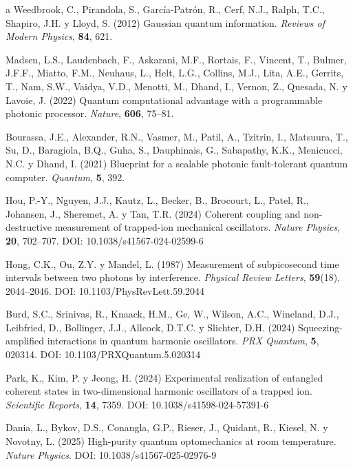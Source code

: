 \documentclass[11pt,a4paper,spanish]{book}
\begin{document}
\begin{thebibliography}{a}
		 Weedbrook, C., Pirandola, S., García-Patrón, R., Cerf, N.J., Ralph, T.C., Shapiro, J.H. y Lloyd, S. (2012) Gaussian quantum information. \textit{Reviews of Modern Physics}, \textbf{84}, 621.
		
		 Madsen, L.S., Laudenbach, F., Askarani, M.F., Rortais, F., Vincent, T., Bulmer, J.F.F., Miatto, F.M., Neuhaus, L., Helt, L.G., Collins, M.J., Lita, A.E., Gerrits, T., Nam, S.W., Vaidya, V.D., Menotti, M., Dhand, I., Vernon, Z., Quesada, N. y Lavoie, J. (2022) Quantum computational advantage with a programmable photonic processor. \textit{Nature}, \textbf{606}, 75--81.
		
		 Bourassa, J.E., Alexander, R.N., Vasmer, M., Patil, A., Tzitrin, I., Matsuura, T., Su, D., Baragiola, B.Q., Guha, S., Dauphinais, G., Sabapathy, K.K., Menicucci, N.C. y Dhand, I. (2021) Blueprint for a scalable photonic fault-tolerant quantum computer. \textit{Quantum}, \textbf{5}, 392.
		
		
		 Hou, P.-Y., Nguyen, J.J., Kautz, L., Becker, B., Brocourt, L., Patel, R., Johansen, J., Sheremet, A. y Tan, T.R. (2024) Coherent coupling and non-destructive measurement of trapped-ion mechanical oscillators. \textit{Nature Physics}, \textbf{20}, 702--707. DOI: 10.1038/s41567-024-02599-6
		
		 Hong, C.K., Ou, Z.Y. y Mandel, L. (1987) Measurement of subpicosecond time intervals between two photons by interference. \textit{Physical Review Letters}, \textbf{59}(18), 2044--2046. DOI: 10.1103/PhysRevLett.59.2044
		
		 Burd, S.C., Srinivas, R., Knaack, H.M., Ge, W., Wilson, A.C., Wineland, D.J., Leibfried, D., Bollinger, J.J., Allcock, D.T.C. y Slichter, D.H. (2024) Squeezing-amplified interactions in quantum harmonic oscillators. \textit{PRX Quantum}, \textbf{5}, 020314. DOI: 10.1103/PRXQuantum.5.020314
		
		 Park, K., Kim, P. y Jeong, H. (2024) Experimental realization of entangled coherent states in two-dimensional harmonic oscillators of a trapped ion. \textit{Scientific Reports}, \textbf{14}, 7359. DOI: 10.1038/s41598-024-57391-6
		
		 Dania, L., Bykov, D.S., Conangla, G.P., Rieser, J., Quidant, R., Kiesel, N. y Novotny, L. (2025) High-purity quantum optomechanics at room temperature. \textit{Nature Physics}. DOI: 10.1038/s41567-025-02976-9
		

\end{thebibliography}
\end{document}
